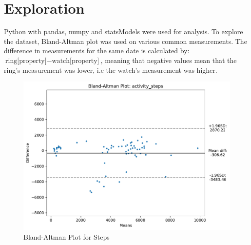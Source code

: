 \section{Exploration}
Python with pandas, numpy and statsModels were used for analysis. To explore the dataset, Bland-Altman plot was used on various common measurements. The difference in measurements for the same date is calculated by: $\text{ring[property]} - \text{watch[property]}$, meaning that negative values mean that the ring's measurement was lower, i.e the watch's measurement was higher.
\begin{figure}
    
    \centering
    \includegraphics[width=\textwidth,keepaspectratio]{../images/bland_altman_steps.pdf}
    \caption{Bland-Altman Plot for Steps}
    \label{fig:blandAltmanSteps}
    
\end{figure}

